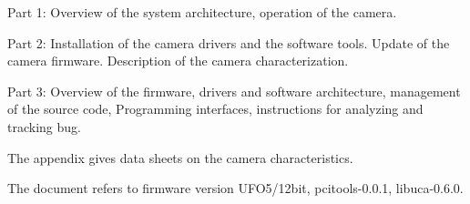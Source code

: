 \documentclass[12pt,a4paper,twoside,parskip=half+]{scrbook}
\begin{document}
Part 1: Overview of the system architecture, operation of the camera. 

Part 2: Installation of the camera drivers and the software tools. Update of the camera firmware.
Description of the camera characterization.

Part 3: Overview of the firmware, drivers and software architecture, management of the source code,
Programming interfaces, instructions for analyzing and tracking bug. 

The appendix gives data sheets on the camera characteristics.

The document refers to firmware version UFO5/12bit, pcitools-0.0.1, libuca-0.6.0.









{}

\end{document}
